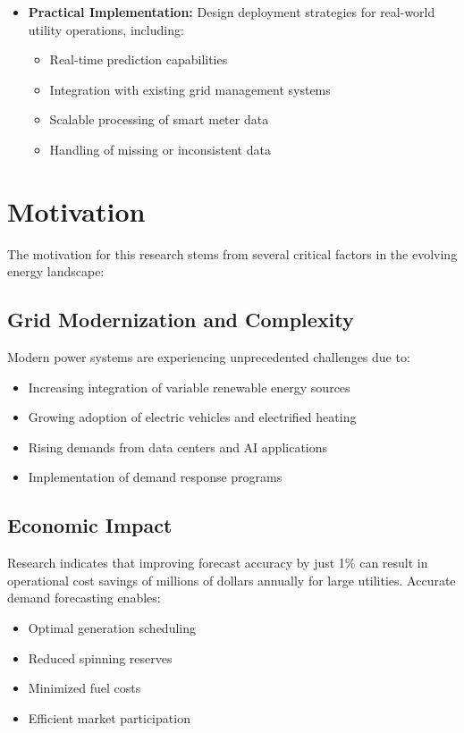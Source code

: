\documentclass[12pt,a4paper]{report}
\begin{document}
\begin{itemize}
\item \textbf{Practical Implementation:} Design deployment strategies for real-world utility operations, including:
  \begin{itemize}
    \item Real-time prediction capabilities
    \item Integration with existing grid management systems
    \item Scalable processing of smart meter data
    \item Handling of missing or inconsistent data
  \end{itemize}
\end{itemize}

\section{Motivation}
The motivation for this research stems from several critical factors in the evolving energy landscape:

\subsection{Grid Modernization and Complexity}
Modern power systems are experiencing unprecedented challenges due to:
\begin{itemize}
\item Increasing integration of variable renewable energy sources
\item Growing adoption of electric vehicles and electrified heating
\item Rising demands from data centers and AI applications
\item Implementation of demand response programs
\end{itemize}

\subsection{Economic Impact}
Research indicates that improving forecast accuracy by just 1\% can result in operational cost savings of millions of dollars annually for large utilities. Accurate demand forecasting enables:
\begin{itemize}
\item Optimal generation scheduling
\item Reduced spinning reserves
\item Minimized fuel costs
\item Efficient market participation
\end{itemize}
\end{document}
